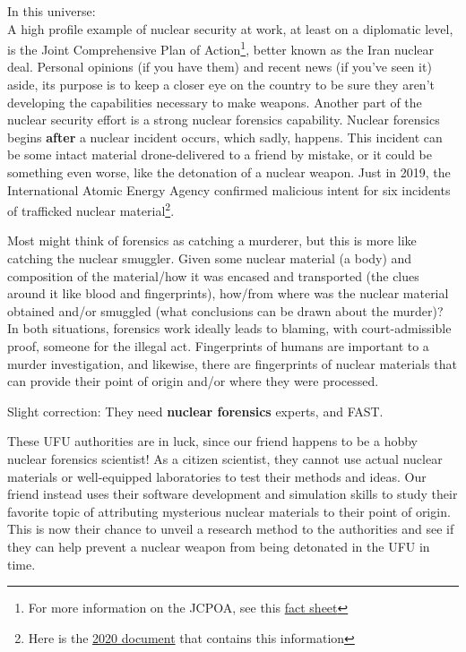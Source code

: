 {\noindent In this universe:\\ A high profile example of nuclear security at
work, at least on a diplomatic level, is the Joint Comprehensive Plan of
Action\footnote{For more information on the JCPOA, see this
\href{https://www.armscontrol.org/factsheets/JCPOA-at-a-glance}{\color{violet}fact
sheet}}, better known as the Iran nuclear deal. Personal opinions (if you have
them) and recent news (if you've seen it) aside, its purpose is to keep a
closer eye on the country to be sure they aren't developing the capabilities
necessary to make weapons.  Another part of the nuclear security effort is a
strong nuclear forensics capability.  Nuclear forensics begins \textbf{after} a
nuclear incident occurs, which sadly, happens. This incident can be some intact
material drone-delivered to a friend by mistake, or it could be something even
worse, like the detonation of a nuclear weapon. Just in 2019, the International
Atomic Energy Agency confirmed malicious intent for six incidents of trafficked
nuclear material\footnote{Here is the
\href{https://www.iaea.org/sites/default/files/20/02/itdb-factsheet-2020.pdf}{\color{violet}2020
document} that contains this information}.

Most might think of forensics as catching a murderer, but this is more like
catching the nuclear smuggler. Given some nuclear material (a body) and
composition of the material\slash how it was encased and transported (the clues
around it like blood and fingerprints), how\slash from where was the nuclear
material obtained and\slash or smuggled (what conclusions can be drawn about
the murder)?  In both situations, forensics work ideally leads to blaming, with
court-admissible proof, someone for the illegal act. Fingerprints of humans are
important to a murder investigation, and likewise, there are fingerprints of
nuclear materials that can provide their point of origin and\slash or where
they were processed.

\begin{shadequote}

  Slight correction: They need \textbf{nuclear forensics} experts, and FAST. 
  
  These UFU authorities are in luck, since our friend happens to be a hobby
  nuclear forensics scientist! As a citizen scientist, they cannot use actual
  nuclear materials or well-equipped laboratories to test their methods and
  ideas. Our friend instead uses their software development and simulation
  skills to study their favorite topic of attributing mysterious nuclear
  materials to their point of origin. This is now their chance to unveil a
  research method to the authorities and see if they can help prevent a nuclear
  weapon from being detonated in the UFU in time. 
  

\end{shadequote}}
